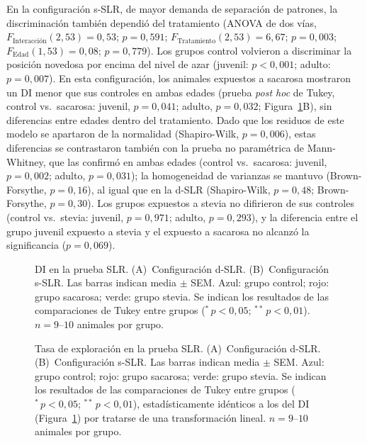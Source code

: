 En la configuración s-SLR, de mayor demanda de separación de patrones, la discriminación también dependió del tratamiento (ANOVA de dos vías, $F_{\text{Interacción}}(2, 53) = 0{,}53$; $p = 0{,}591$; $F_{\text{Tratamiento}}(2, 53) = 6{,}67$; $p = 0{,}003$; $F_{\text{Edad}}(1, 53) = 0{,}08$; $p = 0{,}779$). Los grupos control volvieron a discriminar la posición novedosa por encima del nivel de azar (juvenil: $p < 0{,}001$; adulto: $p = 0{,}007$). En esta configuración, los animales expuestos a sacarosa mostraron un DI menor que sus controles en ambas edades (prueba \textit{post hoc} de Tukey, control vs.\ sacarosa: juvenil, $p = 0{,}041$; adulto, $p = 0{,}032$; Figura~\ref{fig:slr-di}B), sin diferencias entre edades dentro del tratamiento. Dado que los residuos de este modelo se apartaron de la normalidad (Shapiro-Wilk, $p = 0{,}006$), estas diferencias se contrastaron también con la prueba no paramétrica de Mann-Whitney, que las confirmó en ambas edades (control vs.\ sacarosa: juvenil, $p = 0{,}002$; adulto, $p = 0{,}031$); la homogeneidad de varianzas se mantuvo (Brown-Forsythe, $p = 0{,}16$), al igual que en la d-SLR (Shapiro-Wilk, $p = 0{,}48$; Brown-Forsythe, $p = 0{,}30$). Los grupos expuestos a stevia no difirieron de sus controles (control vs.\ stevia: juvenil, $p = 0{,}971$; adulto, $p = 0{,}293$), y la diferencia entre el grupo juvenil expuesto a stevia y el expuesto a sacarosa no alcanzó la significancia ($p = 0{,}069$).

\begin{figure}[htbp]
  \centering
  \caption[DI en la prueba SLR]{DI en la prueba SLR. (A)~Configuración d-SLR. (B)~Configuración s-SLR. Las barras indican media $\pm$ SEM. Azul: grupo control; rojo: grupo sacarosa; verde: grupo stevia. Se indican los resultados de las comparaciones de Tukey entre grupos ($^{*}\,p < 0{,}05$; $^{**}\,p < 0{,}01$). $n = 9$--$10$ animales por grupo.}
  \label{fig:slr-di}
\end{figure}

\begin{figure}[htbp]
  \centering
  \caption[Tasa de exploración en la prueba SLR]{Tasa de exploración en la prueba SLR. (A)~Configuración d-SLR. (B)~Configuración s-SLR. Las barras indican media $\pm$ SEM. Azul: grupo control; rojo: grupo sacarosa; verde: grupo stevia. Se indican los resultados de las comparaciones de Tukey entre grupos ($^{*}\,p < 0{,}05$; $^{**}\,p < 0{,}01$), estadísticamente idénticos a los del DI (Figura~\ref{fig:slr-di}) por tratarse de una transformación lineal. $n = 9$--$10$ animales por grupo.}
  \label{fig:slr-tasa}
\end{figure}

